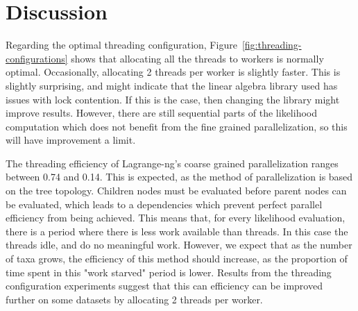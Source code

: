 \documentclass{article}
\begin{document}
\section{Discussion}
\label{sec:discussion}

Regarding the optimal threading configuration, Figure~\ref{fig:threading-configurations} shows that allocating all the
threads to workers is normally optimal. Occasionally, allocating 2 threads per worker is slightly faster. This is
slightly surprising, and might indicate that the linear algebra library used has issues with lock contention. If this is
the case, then changing the library might improve results. However, there are still sequential parts of the likelihood
computation which does not benefit from the fine grained parallelization, so this will have improvement a limit.

The threading efficiency of Lagrange-ng's coarse grained parallelization ranges between  0.74 and 0.14. This is
expected, as the method of parallelization is based on the tree topology. Children nodes must be evaluated before parent
nodes can be evaluated, which leads to a dependencies which prevent perfect parallel efficiency from being achieved.
This means that, for every likelihood evaluation, there is a period where there is less work available than threads. In
this case the threads idle, and do no meaningful work. However, we expect that as the number of taxa grows, the
efficiency of this method should increase, as the proportion of time spent in this "work starved" period is lower.
Results from the threading configuration experiments suggest that this can efficiency can be improved further on some
datasets by allocating 2 threads per worker.



\end{document}
